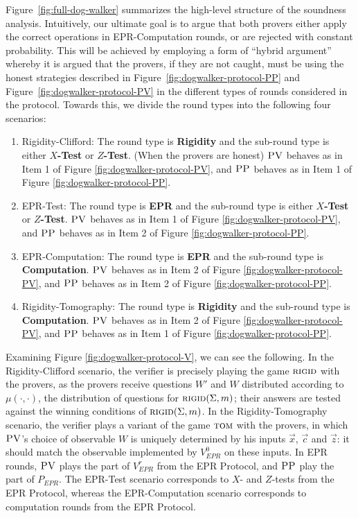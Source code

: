 Figure~\ref{fig:full-dog-walker} summarizes the high-level structure of the soundness analysis. Intuitively, our ultimate goal is to argue that both provers either apply the correct operations in EPR-Computation rounds, or are rejected with constant probability. This will be achieved by employing a form of ``hybrid argument'' whereby it is argued that the provers, if they are not caught, must be using the honest strategies described in Figure~\ref{fig:dogwalker-protocol-PP} and Figure~\ref{fig:dogwalker-protocol-PV} in the different types of rounds considered in the protocol. Towards this, we divide the round types into the following four scenarios:
\begin{enumerate}
\item Rigidity-Clifford: The round type is \textbf{Rigidity} and the sub-round type is either \textbf{$X$-Test} or \textbf{$Z$-Test}. (When the provers are honest) $\textsc{PV}$ behaves as in Item 1 of Figure \ref{fig:dogwalker-protocol-PV}, and $\textsc{PP}$ behaves as in Item 1 of Figure \ref{fig:dogwalker-protocol-PP}. 
\item EPR-Test: The round type is \textbf{EPR} and the sub-round type is either \textbf{$X$-Test} or \textbf{$Z$-Test}. $\textsc{PV}$ behaves as  in Item 1 of Figure \ref{fig:dogwalker-protocol-PV}, and $\textsc{PP}$ behaves as in Item 2 of Figure \ref{fig:dogwalker-protocol-PP}. 
\item EPR-Computation: The round type is \textbf{EPR} and the sub-round type is \textbf{Computation}. $\textsc{PV}$ behaves as in Item 2 of Figure \ref{fig:dogwalker-protocol-PV}, and $\textsc{PP}$ behaves as in Item 2 of Figure \ref{fig:dogwalker-protocol-PP}. 
\item Rigidity-Tomography: The round type is \textbf{Rigidity} and the sub-round type is \textbf{Computation}. $\textsc{PV}$ behaves as in Item 2 of Figure \ref{fig:dogwalker-protocol-PV}, and $\textsc{PP}$ behaves as in Item 1 of Figure \ref{fig:dogwalker-protocol-PP}. 
\end{enumerate}
Examining Figure \ref{fig:dogwalker-protocol-V}, we can see the following. In the Rigidity-Clifford scenario, the verifier is precisely playing the game $\textsc{rigid}$ with the provers, as the provers receive questions $W'$ and $W$ distributed according to $\mu(\cdot,\cdot)$, the distribution of questions for $\textsc{rigid}(\Sigma,m)$; their answers are tested against the winning conditions of $\textsc{rigid}(\Sigma,m)$. In the Rigidity-Tomography scenario, the verifier plays a variant of the game $\textsc{tom}$ with the provers, in which $\textsc{PV}$'s choice of observable $W$ is uniquely determined by his inputs $\vec{x}$, $\vec{c}$ and $\vec{z}$: it should match the observable implemented by $V_{EPR}^0$ on these inputs. In EPR rounds, $\textsc{PV}$ plays the part of $V_{EPR}^r$ from the EPR Protocol, and $\textsc{PP}$ play the part of $P_{EPR}$. The EPR-Test scenario corresponds to $X$- and $Z$-tests from the EPR Protocol, whereas the EPR-Computation scenario corresponds to computation rounds from the EPR Protocol.

